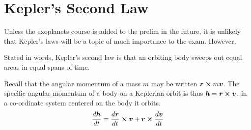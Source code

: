 \section{Kepler's Second Law}
Unless the exoplanets course is added to the prelim in the future, it is unlikely that Kepler's laws will be a topic of much importance to the exam. However,

Stated in words, Kepler's second law is that an orbiting body sweeps out equal areas in equal spans of time.

Recall that the angular momentum of a mass $m$ may be written $\vb*{r} \cp m \vb*{v}$. The specific angular momentum of a body on a Keplerian orbit is thus $\vb*{h} = \vb*{r} \cp \vb*{v}$, in a co-ordinate system centered on the body it orbits.
\begin{align}
    \dv{\vb*{h}}{t} = \dv{\vb*{r}}{t} \cp \vb*{v} + \vb*{r} \cp \dv{\vb*{v}}{t}
\end{align}
